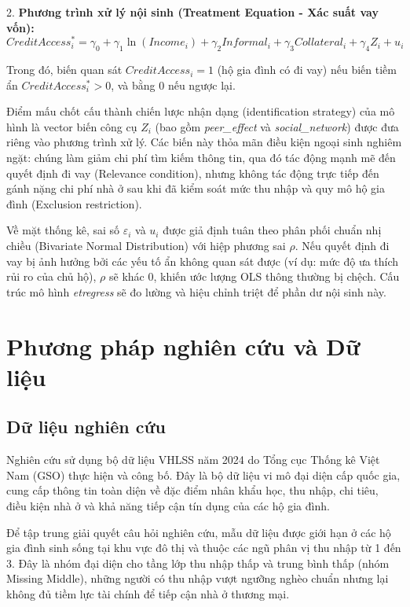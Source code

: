 \documentclass[12pt,a4paper]{report}
\begin{document}
2. \textbf{Phương trình xử lý nội sinh (Treatment Equation - Xác suất vay vốn):}
\begin{equation}
	CreditAccess_i^* = \gamma_0 + \gamma_1 \ln(Income_i) + \gamma_2 Informal_i + \gamma_3 Collateral_i + \gamma_4 Z_i + u_i 
\end{equation}

Trong đó, biến quan sát $CreditAccess_i = 1$ (hộ gia đình có đi vay) nếu biến tiềm ẩn $CreditAccess_i^* > 0$, và bằng $0$ nếu ngược lại. 

Điểm mấu chốt cấu thành chiến lược nhận dạng (identification strategy) của mô hình là vector biến công cụ $Z_i$ (bao gồm \textit{peer\_effect} và \textit{social\_network}) được đưa riêng vào phương trình xử lý. Các biến này thỏa mãn điều kiện ngoại sinh nghiêm ngặt: chúng làm giảm chi phí tìm kiếm thông tin, qua đó tác động mạnh mẽ đến quyết định đi vay (Relevance condition), nhưng không tác động trực tiếp đến gánh nặng chi phí nhà ở sau khi đã kiểm soát mức thu nhập và quy mô hộ gia đình (Exclusion restriction).

Về mặt thống kê, sai số $\varepsilon_i$ và $u_i$ được giả định tuân theo phân phối chuẩn nhị chiều (Bivariate Normal Distribution) với hiệp phương sai $\rho$. Nếu quyết định đi vay bị ảnh hưởng bởi các yếu tố ẩn không quan sát được (ví dụ: mức độ ưa thích rủi ro của chủ hộ), $\rho$ sẽ khác $0$, khiến ước lượng OLS thông thường bị chệch. Cấu trúc mô hình \textit{etregress} sẽ đo lường và hiệu chỉnh triệt để phần dư nội sinh này.
		

\chapter{Phương pháp nghiên cứu và Dữ liệu}

\section{Dữ liệu nghiên cứu}

Nghiên cứu sử dụng bộ dữ liệu VHLSS năm 2024 do Tổng cục Thống kê Việt Nam (GSO) thực hiện và công bố. Đây là bộ dữ liệu vi mô đại diện cấp quốc gia, cung cấp thông tin toàn diện về đặc điểm nhân khẩu học, thu nhập, chi tiêu, điều kiện nhà ở và khả năng tiếp cận tín dụng của các hộ gia đình.

Để tập trung giải quyết câu hỏi nghiên cứu, mẫu dữ liệu được giới hạn ở các hộ gia đình sinh sống tại khu vực đô thị và thuộc các ngũ phân vị thu nhập từ 1 đến 3. Đây là nhóm đại diện cho tầng lớp thu nhập thấp và trung bình thấp (nhóm Missing Middle), những người có thu nhập vượt ngưỡng nghèo chuẩn nhưng lại không đủ tiềm lực tài chính để tiếp cận nhà ở thương mại. 
\end{document}
